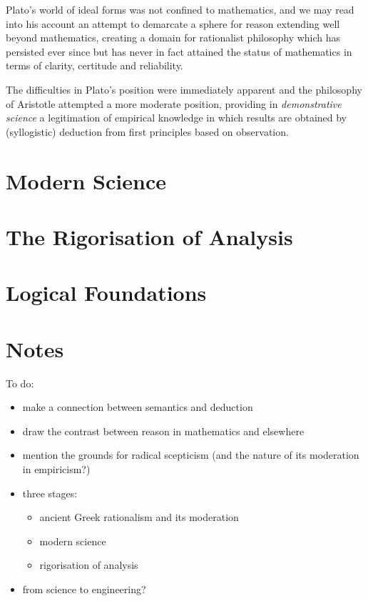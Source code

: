 \documentclass[10pt,titlepage]{book}
\begin{document}
Plato's world of ideal forms was not confined to mathematics, and we may read into his account an attempt to demarcate a sphere for reason extending well beyond mathematics, creating a domain for rationalist philosophy which has persisted ever since but has never in fact attained the status of mathematics in terms of clarity, certitude and reliability.

The difficulties in Plato's position were immediately apparent and the philosophy of Aristotle attempted a more moderate position, providing in \emph{demonstrative science} a legitimation of empirical knowledge in which results are obtained by (syllogistic) deduction from first principles based on observation.

\section{Modern Science}

\section{The Rigorisation of Analysis}

\section{Logical Foundations}

\section{Notes}

To do:
\begin{itemize}
\item make a connection between semantics and deduction
\item draw the contrast between reason in mathematics and elsewhere
  \item mention the grounds for radical scepticism (and the nature of its moderation in empiricism?)
  \item three stages:
    \begin{itemize}
      \item
        ancient Greek rationalism and its moderation
      \item modern science
      \item rigorisation of analysis
    \end{itemize}
    \item from science to engineering?
\end{itemize}
\end{document}
